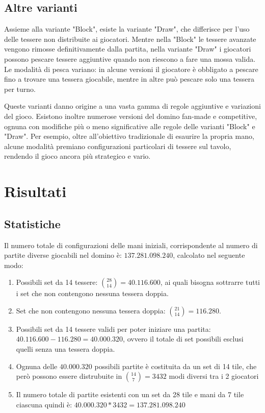 \documentclass[a4paper.12pt]{report} %
\begin{document}
\section{Altre varianti}

Assieme alla variante "Block", esiste la variante "Draw", che differisce per l'uso delle tessere non distribuite ai giocatori. Mentre nella "Block" le tessere avanzate vengono rimosse definitivamente dalla partita, nella variante "Draw" i giocatori possono pescare tessere aggiuntive quando non riescono a fare una mossa valida. Le modalità di pesca variano: in alcune versioni il giocatore è obbligato a pescare fino a trovare una tessera giocabile, mentre in altre può pescare solo una tessera per turno.


Queste varianti danno origine a una vasta gamma di regole aggiuntive e variazioni del gioco. Esistono inoltre numerose versioni del domino fan-made e competitive, ognuna con modifiche più o meno significative alle regole delle varianti "Block" e "Draw". Per esempio, oltre all’obiettivo tradizionale di esaurire la propria mano, alcune modalità premiano configurazioni particolari di tessere sul tavolo, rendendo il gioco ancora più strategico e vario.


\chapter{Risultati}

\section{Statistiche}

Il numero totale di configurazioni delle mani iniziali, corrispondente al numero di partite diverse giocabili nel domino è: \(137.281.098.240\), calcolato nel seguente modo:


\begin{enumerate}
    \item Possibili set da 14 tessere: \(\binom{28}{14} = 40.116.600\), ai quali bisogna sottrarre tutti i set che non contengono nessuna tessera doppia.
    \item Set che non contengono nessuna tessera doppia: \(\binom{21}{14} = 116.280\).
    \item Possibili set da 14 tessere validi per poter iniziare una partita: \(40.116.600 - 116.280 = 40.000.320\), ovvero il totale di set possibili esclusi quelli senza una tessera doppia.
    \item Ognuna delle \(40.000.320\) possibili partite è costituita da un set di 14 tile, che però possono essere distrubuite in \(\binom{14}{7} = 3432\) modi diversi tra i 2 giocatori
    \item Il numero totale di partite esistenti con un set da 28 tile e mani da 7 tile ciascuna quindi è: \(40.000.320 * 3432 = 137.281.098.240\)
\end{enumerate}
\end{document}
